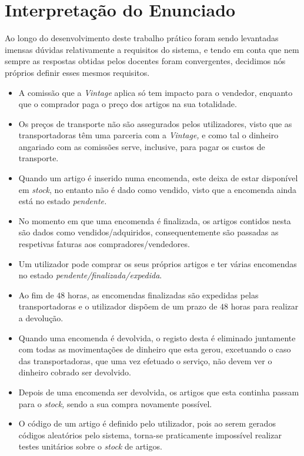 \chapter{Interpretação do Enunciado}

    Ao longo do desenvolvimento deste trabalho prático foram sendo levantadas imensas dúvidas relativamente a requisitos do sistema, e tendo em conta que nem sempre as respostas obtidas pelos docentes foram convergentes, decidimos nós próprios definir esses mesmos requisitos.

    \begin{itemize}

        \item A comissão que a \textit{Vintage} aplica só tem impacto para o vendedor, enquanto que o comprador paga o preço dos artigos na sua totalidade.

        \item Os preços de transporte não são assegurados pelos utilizadores, visto que as transportadoras têm uma parceria com a \textit{Vintage,} e como tal o dinheiro angariado com as comissões serve, inclusive, para pagar os custos de transporte.
        
        \item Quando um artigo é inserido numa encomenda, este deixa de estar disponível em \textit{stock}, no entanto não é dado como vendido, visto que a encomenda ainda está no estado \textit{pendente.}

        \item No momento em que uma encomenda é finalizada, os artigos contidos nesta são dados como vendidos/adquiridos, consequentemente são passadas as respetivas faturas aos compradores/vendedores.

        \item Um utilizador pode comprar os seus próprios artigos e ter várias encomendas no estado \textit{pendente/finalizada/expedida}.

        \item Ao fim de $48$ horas, as encomendas finalizadas são expedidas pelas transportadoras e o utilizador dispõem de um prazo de $48$ horas para realizar a devolução.

        \item Quando uma encomenda é devolvida, o registo desta é eliminado juntamente com todas as movimentações de dinheiro que esta gerou, excetuando o caso das transportadoras, que uma vez efetuado o serviço, não devem ver o dinheiro cobrado ser devolvido.

        \item Depois de uma encomenda ser devolvida, os artigos que esta continha passam para o \textit{stock,} sendo a sua compra novamente possível.

        \item O código de um artigo é definido pelo utilizador, pois ao serem gerados códigos aleatórios pelo sistema, torna-se praticamente impossível realizar testes unitários sobre o \textit{stock} de artigos. 

    \end{itemize}